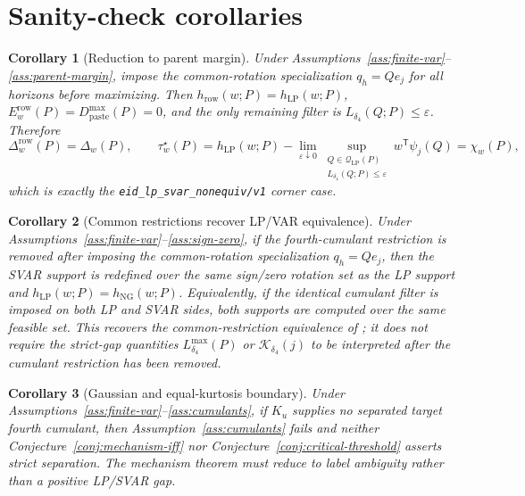 \documentclass[11pt]{article}
\newcommand{\transpose}{\mathsf{T}}
\theoremstyle{definition}
\theoremstyle{plain}
\newtheorem{corollary}{Corollary}
\theoremstyle{remark}
\begin{document}
\section{Sanity-check corollaries}
\begin{corollary}[Reduction to parent margin]\label{cor:parent}
Under Assumptions~\ref{ass:finite-var}--\ref{ass:parent-margin}, impose the common-rotation specialization \(q_h=Qe_j\) for all horizons before maximizing.  Then \(h_{\mathrm{row}}(w;P)=h_{\mathrm{LP}}(w;P)\), \(E_w^{\mathrm{row}}(P)=D_{\mathrm{paste}}^{\max}(P)=0\), and the only remaining filter is \(L_{\delta_4}(Q;P)\le\varepsilon\).  Therefore
\[
\Delta_w^{\mathrm{row}}(P)=\Delta_w(P),\qquad
\tau_w^\star(P)=
h_{\mathrm{LP}}(w;P)-
\lim_{\varepsilon\downarrow0}
\sup_{\substack{Q\in\mathcal Q_{\mathrm{LP}}(P)\\L_{\delta_4}(Q;P)\le\varepsilon}}
w^\transpose\psi_j(Q)
=\chi_w(P),
\]
which is exactly the \texttt{eid\_lp\_svar\_nonequiv/v1} corner case.
\end{corollary}

\begin{corollary}[Common restrictions recover LP/VAR equivalence]\label{cor:common}
Under Assumptions~\ref{ass:finite-var}--\ref{ass:sign-zero}, if the fourth-cumulant restriction is removed after imposing the common-rotation specialization \(q_h=Qe_j\), then the SVAR support is redefined over the same sign/zero rotation set as the LP support and \(h_{\mathrm{LP}}(w;P)=h_{\mathrm{NG}}(w;P)\).  Equivalently, if the identical cumulant filter is imposed on both LP and SVAR sides, both supports are computed over the same feasible set.  This recovers the common-restriction equivalence of \citet{PlagborgMollerWolf2021}; it does not require the strict-gap quantities \(L_{\delta_4}^{\max}(P)\) or \(\mathcal K_{\delta_4}(j)\) to be interpreted after the cumulant restriction has been removed.
\end{corollary}

\begin{corollary}[Gaussian and equal-kurtosis boundary]\label{cor:gaussian}
Under Assumptions~\ref{ass:finite-var}--\ref{ass:cumulants}, if \(K_u\) supplies no separated target fourth cumulant, then Assumption~\ref{ass:cumulants} fails and neither Conjecture~\ref{conj:mechanism-iff} nor Conjecture~\ref{conj:critical-threshold} asserts strict separation.  The mechanism theorem must reduce to label ambiguity rather than a positive LP/SVAR gap.
\end{corollary}
\end{document}
